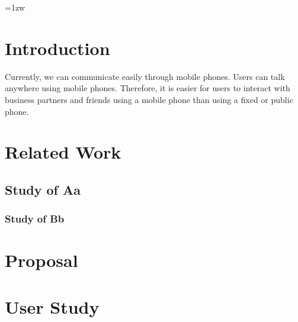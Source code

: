 \documentclass[a4paper, dvipdfmx]{report}
\subtitle{—図書館情報メディア研究科の場合—}{: A Case Study at the Graduate School of Library, Information, and Media Studies}
\begin{document}
\makecover

\addtolength{\textheight}{-5mm}	%
\setlength{\footskip}{15mm}	%
\fontsize{11pt}{15pt}\selectfont

\pagebreak\setcounter{page}{1}
\pagestyle{plain}
\tableofcontents
\listoffigures

\parindent=1zw	%
\pagebreak\setcounter{page}{1}
\pagestyle{plain}


\chapter{Introduction}
Currently, we can communicate easily through mobile phones. Users can talk anywhere using mobile phones. Therefore, it is easier for users to interact with business partners and friends using a mobile phone than using a fixed or public phone. \cite{xu2017deep}

\chapter{Related Work}
\section{Study of Aa}
\subsection{Study of Bb}

\chapter{Proposal}

\chapter{User Study}
\end{document}
